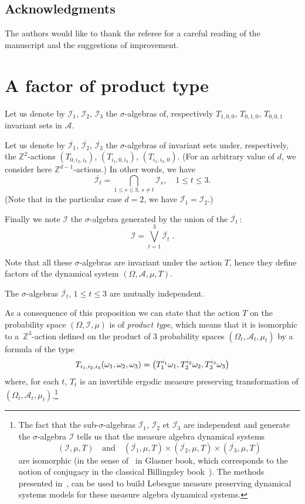 \documentclass[AHL,Unicode,longabstracts,published]{cedram}
\newcommand{\Z}{\mathbb{Z}}
\newcommand*\I{\mathcal{I}}
\newcommand*\A{\mathcal{A}}
\let\originalleft\left
\let\originalright\right
\renewcommand{\left}{\mathopen{}\mathclose\bgroup\originalleft}
\renewcommand{\right}{\aftergroup\egroup\originalright}
\begin{document}
\subsection*{Acknowledgments}
The authors would like to thank the referee for a careful reading of the manuscript and the suggestions of improvement.

\section{A factor of product type}\label{product-type factor}
{Let us denote by $\I_1$, $\I_2$, $\I_3$ the $\sigma$-algebras of, respectively $T_{1,0,0}$, $T_{0,1,0}$, $T_{0,0,1}$ invariant sets in $\A$.

Let us denote by $\overline{\I_1}$, $\overline{\I_2}$, $\overline{\I_3}$ the $\sigma$-algebras of invariant sets under, respectively, the $\Z^{2}$-actions $(T_{0,i_2,i_3})$, $(T_{i_1,0,i_3})$, $(T_{i_1,i_2,0})$. (For an arbitrary value of $d$, we consider here $\Z^{d-1}$-actions.) In other words, we have
\[
\overline{\I_t}=\bigcap_{1\leq s\leq 3,\,s\neq t}\I_s, \quad 1\leq t\leq 3.
\]
(Note that in the particular case $d=2$, we have $\overline{\I_1}=\I_2$.)

Finally we note $\I$ the $\sigma$-algebra generated by the union of the $\overline{\I_t}\,$:
\[
\I=\bigvee_{t=1}^3\overline{\I_t}\;.
\]
}

Note that all these $\sigma$-algebras are invariant under the action $T$, hence they define factors of the dynamical system $(\Omega,\A,\mu,T)$.

\begin{prop}\label{indep}
The $\sigma$-algebras $\overline{\I_t}$, $1\leq t\leq 3$ are mutually independent.
\end{prop}

As a consequence of this proposition we can state that the action $T$ on the probability space $(\Omega,\I,\mu)$ is of \emph{product type}, which means that it is isomorphic to a~$\Z^3$-action defined on the product of $3$ probability spaces $(\Omega_t,\A_t,\mu_t)$ by a formula of the type
\[
T_{i_1,i_2,i_3}(\omega_1,\omega_2,\omega_3)=
\left(T_1^{i_1}\omega_1,T_2^{i_2}\omega_2,T_3^{i_3}\omega_3\right)
\]
where, for each $t$, $T_t$ is an invertible ergodic measure preserving transformation of $(\Omega_t,\A_t,\mu_t)$.\footnote{The fact that the sub-$\sigma$-algebras $\overline{\I_1}$, $\overline{\I_2}$ et $\overline{\I_3}$ are independent and generate the $\sigma$-algebra $\I$ tells us that the measure algebra dynamical systems
\[
(\I,\mu,T) \quad\text{and}\quad (\overline{\I_1},\mu,T) \times (\overline{\I_2},\mu,T) \times (\overline{\I_3},\mu,T)
\]
are isomorphic (in the sense of~\cite[Definition~2.14]{MR1958753} in Glasner book, which corresponds to the notion of conjugacy in the classical Billingsley book~\cite{MR192027}). The methods presented in~\cite[Chapter~2]{MR1958753}, can be used to build Lebesgue measure preserving dynamical systems models for these measure algebra dynamical systems.}
\end{document}

